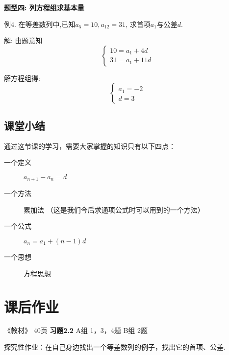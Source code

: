 \documentclass[10pt,a4paper]{article}
\begin{document}
	

			\textbf{题型四: 列方程组求基本量}

				例4. 在等差数列中,已知$a_5=10, a_{12}=31$, 求首项$a_1$与公差$d$. \\ 	

				{\color{cyan} 解: 由题意知\\
				\[ \left\{ 
					\begin{array}{l}
						10=a_1+4d\\
						31=a_1+11d
					\end{array}
					\right. \] 	

				解方程组得:\\
				\[ \left\{ 
					\begin{array}{l}
						a_1=-2\\
						d=3
					\end{array}
					\right. \]}



		\subsection{课堂小结}
			通过这节课的学习，需要大家掌握的知识只有以下四点：
			\begin{description}
			\item[一个定义] $a_{n+1}-a_n=d$
			\item[一个方法] 累加法 （这是我们今后求通项公式时可以用到的一个方法）
			\item[一个公式] $a_n=a_1+(n-1)d$
			\item[一个思想] 方程思想
			\end{description}


		\section{课后作业}

			《教材》 40页 \hspace{10pt}\textbf{习题2.2 } \hspace{10pt}  A组 1，3，4题  \hspace{10pt}  B组 2题

			探究性作业：在自己身边找出一个等差数列的例子，找出它的首项、公差. 
\end{document}

